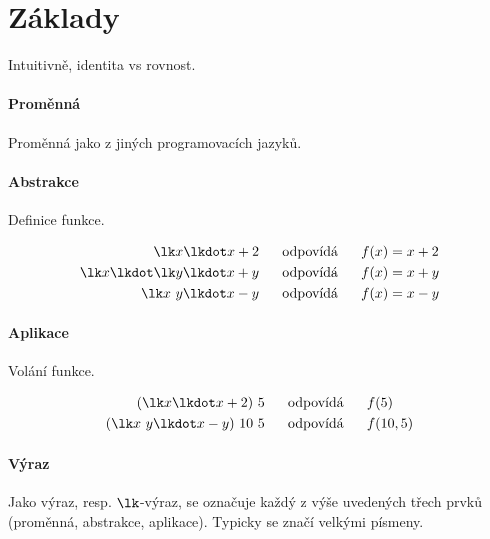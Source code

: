 
\section{Základy}

\begin{compactitem}
    \item Intuitivně, identita vs rovnost.
\end{compactitem}

\paragraph*{Proměnná} Proměnná jako z jiných programovacích jazyků.

\paragraph*{Abstrakce} Definice funkce.

\begin{equation}
    \begin{split}
        \lk x \lkdot x+2 &~~~~~ \text{odpovídá} ~~~~~ f(x) = x+2 \\
        \lk x \lkdot \lk y \lkdot x+y &~~~~~ \text{odpovídá} ~~~~~ f(x) = x+y \\
        \lk x ~ y \lkdot x-y &~~~~~ \text{odpovídá} ~~~~~ f(x) = x-y
    \end{split}
\end{equation}

\paragraph*{Aplikace} Volání funkce.

\begin{equation}
    \begin{split}
        ( \lk x \lkdot x+2) ~ 5 &~~~~~ \text{odpovídá} ~~~~~ f(5) \\
        ( \lk x ~ y \lkdot x-y) ~ 10 ~ 5 &~~~~~ \text{odpovídá} ~~~~~ f(10, 5)
    \end{split}
\end{equation}

\paragraph*{Výraz} Jako výraz, resp. $\lk$-výraz, se označuje každý z výše uvedených třech prvků (proměnná, abstrakce, aplikace). Typicky se značí velkými písmeny.

